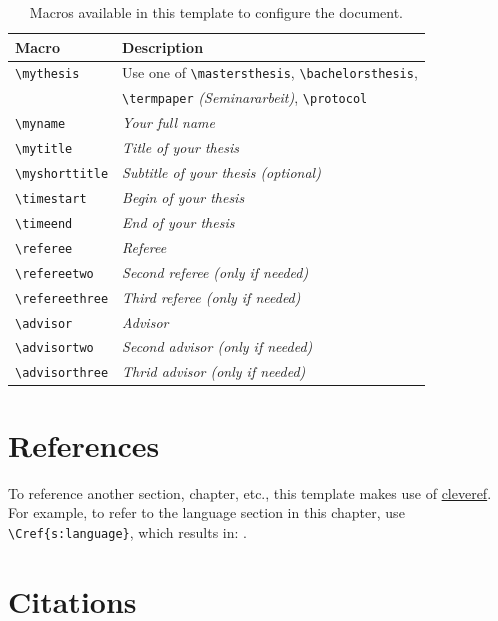 \begin{table}[ht!]
\caption{Macros available in this template to configure the document.}
\vspace*{0.5cm}
\centering
\begin{tabular}{ll}
\toprule
Macro & Description \\
\midrule 
\texttt{\textbackslash mythesis} & Use one of \texttt{\textbackslash mastersthesis}, \texttt{\textbackslash bachelorsthesis}, \\
& \texttt{\textbackslash termpaper} \emph{(Seminararbeit)}, \texttt{\textbackslash protocol} \\
\texttt{\textbackslash myname} & \emph{Your full name} \\
\texttt{\textbackslash mytitle} & \emph{Title of your thesis} \\
\texttt{\textbackslash myshorttitle} & \emph{Subtitle of your thesis (optional)} \\
\texttt{\textbackslash timestart} & \emph{Begin of your thesis} \\
\texttt{\textbackslash timeend} & \emph{End of your thesis} \\
\texttt{\textbackslash referee} & \emph{Referee} \\
\texttt{\textbackslash refereetwo} & \emph{Second referee (only if needed)} \\
\texttt{\textbackslash refereethree} & \emph{Third referee (only if needed)} \\
\texttt{\textbackslash advisor} & \emph{Advisor} \\
\texttt{\textbackslash advisortwo} & \emph{Second advisor (only if needed)} \\
\texttt{\textbackslash advisorthree} & \emph{Thrid advisor (only if needed)} \\
\bottomrule
\end{tabular}
\label{tab:macros}
\end{table}


\section{References}

To reference another section, chapter, etc., this template makes use of \href{https://ctan.org/pkg/cleveref?lang=en}{cleveref}.
For example, to refer to the language section in this chapter, use \texttt{\textbackslash{}Cref\{s:language\}}, which results in: .


\section{Citations}

